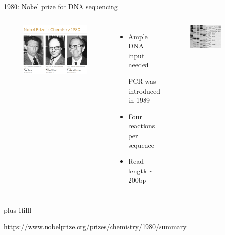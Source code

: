 \documentclass[10pt]{beamer}
\newcommand{\creditleft}[1]{{\vskip0pt plus 1filll \par \raggedright \scriptsize \mdseries \color{mDarkBrown} #1 \par}}
\begin{document}
\begin{frame}{1980: Nobel prize for DNA sequencing}
	\begin{columns}[T,onlytextwidth]
		\begin{figure}
			\includegraphics[width=\textwidth]{./figures/nobel-sanger.png}
		\end{figure}
		\begin{itemize}
			\item Ample DNA input needed\par {\scriptsize PCR was introduced in 1989}
			\item Four reactions per sequence
			\item Read length $\sim$ 200bp
		\end{itemize}
		\vspace{0.2cm}
		\begin{figure}
			\includegraphics[width=0.8\textwidth]{./figures/sangergel.png}
		\end{figure}
	\end{columns}
 \creditleft{\url{https://www.nobelprize.org/prizes/chemistry/1980/summary}}
\end{frame}
\end{document}
